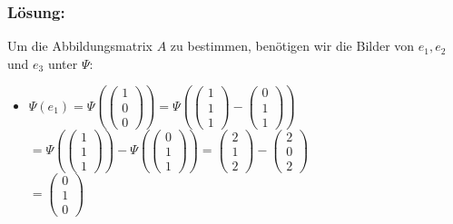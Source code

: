 \begin{frame}\frametitle{Lösung:}
%
Um die Abbildungsmatrix $A$ zu bestimmen, benötigen wir die Bilder von $e_1,e_2$ und $e_3$ unter $\Psi$:

\begin{itemize}

\item $\Psi(e_1)=\Psi(\begin{pmatrix} 1 \\ 0\\0\end{pmatrix})=\Psi(\begin{pmatrix}1\\1\\1 \end{pmatrix}- \begin{pmatrix} 0\\1\\1\end{pmatrix})$\\\hspace{10,5mm}$=\Psi(\begin{pmatrix}1\\1\\1 \end{pmatrix})-\Psi(\begin{pmatrix} 0\\1\\1\end{pmatrix})=\begin{pmatrix}2 \\ 1 \\ 2 \end{pmatrix}-\begin{pmatrix} 2 \\ 0 \\ 2\end{pmatrix}$\\\hspace{10,5mm}$=\begin{pmatrix} 0 \\ 1 \\ 0\end{pmatrix}$
	

\end{itemize}


\end{frame}
%

